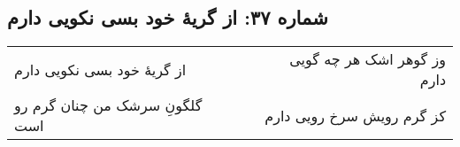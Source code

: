 \begin{center}
\section*{شماره ۳۷: از گریۀ خود بسی نکویی دارم}
\label{sec:037}
\begin{longtable}{l p{0.5cm} r}
از گریهٔ خود بسی نکویی دارم
&&
وز گوهر اشک هر چه گویی دارم
\\
گلگونِ سرشک من چنان گرم رو است
&&
کز گرم رویش سرخ رویی دارم
\\
\end{longtable}
\end{center}
